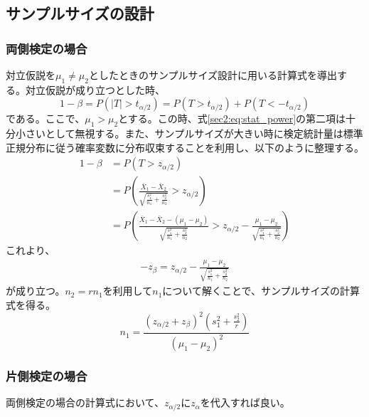 \subsection{サンプルサイズの設計}

\subsubsection{両側検定の場合}

対立仮説を$\mu_{1} \neq \mu_{2}$としたときのサンプルサイズ設計に用いる計算式を導出する。対立仮説が成り立つとした時、
\begin{equation}
    1 - \beta = P(|T| > t_{\alpha/2}) = P(T > t_{\alpha/2}) + P(T < -t_{\alpha/2}) \label{sec2:eq:stat_power}
\end{equation}
である。ここで、$\mu_{1} > \mu_{2}$とする。この時、式\eqref{sec2:eq:stat_power}の第二項は十分小さいとして無視する。また、サンプルサイズが大きい時に検定統計量は標準正規分布に従う確率変数に分布収束することを利用し、以下のように整理する。
\begin{align}
    1 - \beta & = P(T > z_{\alpha/2})                                                                                                                                                                                                                \\
              & = P\left(\frac{\bar{X}_{1} - \bar{X}_{2}}{\sqrt{\frac{s_{1}^{2}}{n_{1}} + \frac{s_{2}^{2}}{n_{2}}}} > z_{\alpha/2}\right)                                                                                                            \\
              & = P\left(\frac{\bar{X}_{1} - \bar{X}_{2} - (\mu_{1} - \mu_{2})}{\sqrt{\frac{s_{1}^{2}}{n_{1}} + \frac{s_{2}^{2}}{n_{2}}}} > z_{\alpha/2} - \frac{\mu_{1} - \mu_{2}}{\sqrt{\frac{s_{1}^{2}}{n_{1}} + \frac{s_{2}^{2}}{n_{2}}}}\right)
\end{align}
これより、
\begin{align}
    -z_{\beta} = z_{\alpha/2} - \frac{\mu_{1} - \mu_{2}}{\sqrt{\frac{s_{1}^{2}}{n_{1}} + \frac{s_{2}^{2}}{n_{2}}}}
\end{align}
が成り立つ。$n_{2} = rn_{1}$を利用して$n_{1}$について解くことで、サンプルサイズの計算式を得る。
\begin{equation}
    n_{1} = \frac{(z_{\alpha/2} + z_{\beta})^{2} \left(s_{1}^{2} + \frac{s_{2}^{2}}{r}\right)}{(\mu_{1} - \mu_{2})^{2}}
\end{equation}

\subsubsection{片側検定の場合}
両側検定の場合の計算式において、$z_{\alpha/2}$に$z_{\alpha}$を代入すれば良い。

